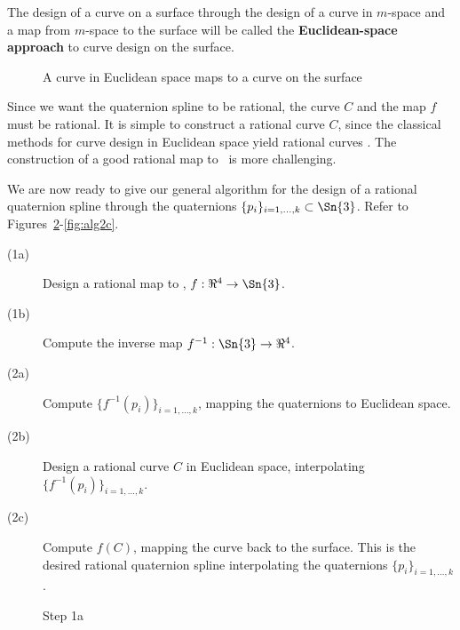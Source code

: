 \begin{defn2}
The design of a curve on a surface through the design of a curve in $m$-space
and a map from $m$-space to the surface will be called the {\bf Euclidean-space
approach} to curve design on the surface.
\end{defn2}
\begin{figure}
\vspace{2.5in}
\caption{A curve in Euclidean space maps to a curve on the surface}
\label{fig:reduce}
\end{figure}

Since we want the quaternion spline to be rational,
the curve $C$ and the map $f$ must be rational.
It is simple to construct a rational curve $C$,
since the classical methods for curve design in Euclidean space yield 
rational curves \cite{farin97}.
The construction of a good rational map to \ is more challenging.

We are now ready to give our general algorithm for the design of a rational
quaternion spline through the quaternions
$\{p_i\}_{i=1,\ldots,k} \subset \Sn{3}$.
Refer to Figures~\ref{fig:alg1a}-\ref{fig:alg2c}.
%
\begin{description}
\item[(1a)] Design a rational map to , $f:\Re^4 \rightarrow \Sn{3}$.
\item[(1b)] Compute the inverse map $f^{-1}:\Sn{3} \rightarrow \Re^4$.
\item[(2a)] Compute $\{f^{-1}(p_i)\}_{i=1,\ldots,k}$, 
	    mapping the quaternions to Euclidean space.
\item[(2b)] Design a rational curve $C$ in Euclidean space, interpolating $\{f^{-1}(p_i)\}_{i=1,\ldots,k}$.
\item[(2c)] Compute $f(C)$, mapping the curve back to the surface.
	    This is the desired rational quaternion spline interpolating
	    the quaternions $\{p_i\}_{i=1,\ldots,k}$.
\end{description}

\clearpage
\twocolumn

\begin{figure}
\vspace{2in}
\caption{Step 1a}
\label{fig:alg1a}
\end{figure}

